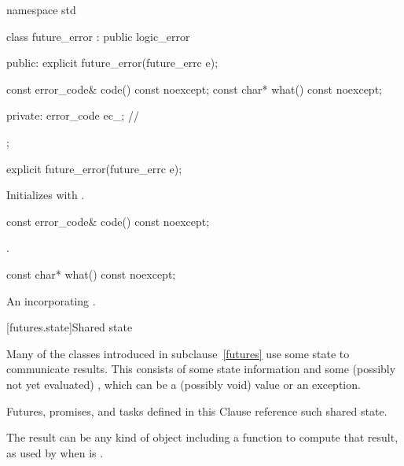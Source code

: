 %
\begin{codeblock}
namespace std {
  class future_error : public logic_error {
  public:
    explicit future_error(future_errc e);

    const error_code& code() const noexcept;
    const char*       what() const noexcept;

  private:
    error_code ec_;             // \expos
  };
}
\end{codeblock}

%
\begin{itemdecl}
explicit future_error(future_errc e);
\end{itemdecl}

\begin{itemdescr}
\pnum
\effects
Initializes  with .
\end{itemdescr}

%
\begin{itemdecl}
const error_code& code() const noexcept;
\end{itemdecl}

\begin{itemdescr}
\pnum
\returns
{}.
\end{itemdescr}

%
\begin{itemdecl}
const char* what() const noexcept;
\end{itemdecl}

\begin{itemdescr}
\pnum
\returns
An \ntbs{} incorporating .
\end{itemdescr}

[futures.state]{Shared state}

\pnum
Many of the classes introduced in subclause~\ref{futures} use some state to communicate results. This
 consists of some state information and some (possibly not
yet evaluated) , which can be a (possibly void) value or an exception.
\begin{note}
Futures, promises, and tasks defined in this Clause reference such shared state.
\end{note}

\pnum
\begin{note}
The result can be any kind of object including a function to compute that result,
as used by  when  is .
\end{note}

